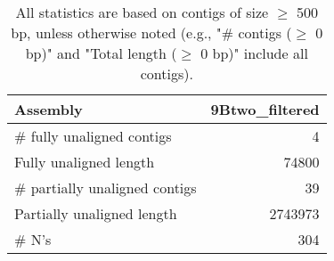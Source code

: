 \documentclass[12pt,a4paper]{article}
\begin{document}
\begin{table}[ht]
\begin{center}
\caption{All statistics are based on contigs of size $\geq$ 500 bp, unless otherwise noted (e.g., "\# contigs ($\geq$ 0 bp)" and "Total length ($\geq$ 0 bp)" include all contigs).}
\begin{tabular}{|l*{1}{|r}|}
\hline
Assembly & 9Btwo\_filtered \\ \hline
\# fully unaligned contigs & 4 \\ \hline
Fully unaligned length & 74800 \\ \hline
\# partially unaligned contigs & 39 \\ \hline
Partially unaligned length & 2743973 \\ \hline
\# N's & 304 \\ \hline
\end{tabular}
\end{center}
\end{table}
\end{document}
